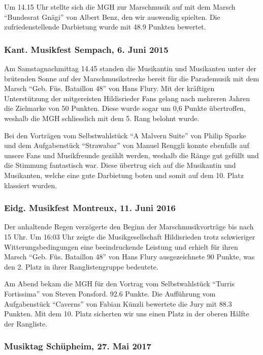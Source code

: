\begin{history}
    Um 14.15 Uhr stellte sich die MGH zur Marschmusik auf mit dem Marsch
    \enquote{Bundesrat Gnägi} von Albert Benz, den wir auswendig spielten. Die
    zufriedenstellende Darbietung wurde mit 48.9 Punkten bewertet.


    \subsubsection*{Kant. Musikfest Sempach, 6. Juni 2015}

    Am Samstagnachmittag 14.45 standen die Musikantin und Musikanten unter der
    brütenden Sonne auf der Marschmusikstrecke bereit für die Parademusik mit
    dem Marsch \enquote{Geb. Füs. Bataillon 48} von Hans Flury. Mit der
    kräftigen Unterstützung der mitgereisten Hildisrieder Fans gelang nach
    mehreren Jahren die Zielmarke von 50 Punkten. Diese wurde sogar um 0,6
    Punkte übertroffen, weshalb die MGH schliesslich mit dem 5. Rang belohnt
    wurde.

    Bei den Vorträgen vom Selbstwahlstück \enquote{A Malvern Suite} von Philip
    Sparke und dem Aufgabenstück \enquote{Strawabar} von Manuel Renggli konnte
    ebenfalls auf unsere Fans und Musikfreunde gezählt werden, weshalb die Ränge
    gut gefüllt und die Stimmung fantastisch war.  Diese übertrug sich auf die
    Musikantin und Musikanten, welche eine gute Darbietung boten und somit auf
    dem 10. Platz klassiert wurden.


    \subsubsection*{Eidg. Musikfest Montreux, 11. Juni 2016}

    Der anhaltende Regen verzögerte den Beginn der Marschmusikvorträge bis nach
    15 Uhr. Um 16:03 Uhr zeigte die Musikgesellschaft Hildisrieden trotz
    schwieriger Witterungsbedingungen eine beeindruckende Leistung und erhielt
    für ihren Marsch \enquote{Geb. Füs. Bataillon 48} von Hans Flury
    ausgezeichnete 90 Punkte, was den 2. Platz in ihrer Ranglistengruppe
    bedeutete.

    Am Abend bekam die MGH für den Vortrag vom Selbstwahlstück \enquote{Turris
        Fortissima} von Steven Ponsford. 92.6 Punkte. Die Aufführung vom
    Aufgabenstück \enquote{Caverns} von Fabian Künzli bewertete die Jury mit
    88.3 Punkten. Mit dem 10. Platz sicherten wir uns einen Platz in der
    oberen Hälfte der Rangliste.


    \subsubsection*{Musiktag Schüpheim, 27. Mai 2017}


\end{history}

